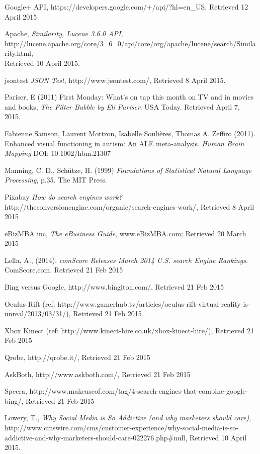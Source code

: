 \documentclass[a4paper, 11pt]{article}
\begin{document}
\begin{thebibliography}{100}
 Google+ API, https://developers.google.com/+/api/?hl=en\_US, Retrieved 12 April 2015

 Apache, \textit{Similarity, Lucene 3.6.0 API},  \\http://lucene.apache.org/core/3\_6\_0/api/core/org/apache/lucene/search/Similarity.html, \\Retrieved 10 April 2015.

jsontest \textit{JSON Test}, http://www.jsontest.com/, Retrieved 8 April 2015.

 Pariser, E (2011) First Monday: What's on tap this month on TV and in movies and books, \textit{The Filter Bubble by Eli Pariser}. USA Today. Retrieved April 7, 2015. 

Fabienne Samson, Laurent Mottron, Isabelle Soulières, Thomas A. Zeffiro (2011). Enhanced visual functioning in autism: An ALE meta-analysis. \textit{Human Brain Mapping} DOI: 10.1002/hbm.21307

Manning, C. D., Schütze, H. (1999) \textit{Foundations of Statistical Natural Language Processing}, p.35. The MIT Press.

 Pixabay \textit{How do search engines work?} http://theconversionengine.com/organic/search-engines-work/, Retrieved 8 April 2015

eBizMBA inc, \textit{The eBusiness Guide}, www.eBizMBA.com; Retrieved 20 March 2015

Lella, A., (2014). \textit{comScore Releases March 2014 U.S. search Engine Rankings.} ComScore.com. Retrieved 21 Feb 2015

 Bing versus Google, http://www.bingiton.com/, Retrieved 21 Feb 2015 

 Oculus Rift (ref: http://www.gamerhub.tv/articles/oculus-rift-virtual-reality-is-unreal/2013/03/31/), Retrieved 21 Feb 2015 

 Xbox Kinect (ref: http://www.kinect-hire.co.uk/xbox-kinect-hire/), Retrieved 21 Feb 2015

 Qrobe, http://qrobe.it/, Retrieved 21 Feb 2015 

 AskBoth, http://www.askboth.com/, Retrieved 21 Feb 2015 

 Specra, http://www.makeuseof.com/tag/4-search-engines-that-combine-google-bing/, Retrieved 21 Feb 2015 

 Lowery, T., \textit{Why Social Media is So Addictive (and why marketers should care)}, http://www.cmswire.com/cms/customer-experience/why-social-media-is-so-addictive-and-why-marketers-should-care-022276.php\#null, Retrieved 10 April 2015.


\end{thebibliography}
\end{document}
